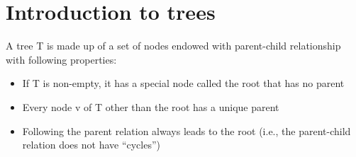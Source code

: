 \documentclass[12pt]{article}
\newcommand{\1}{\space \quad}
\newcommand{\2}{\quad \quad \quad}
\newcommand{\3}{\quad \quad \quad \quad \space}
\newcommand{\4}{\quad \quad \quad \quad \quad \quad}
\begin{document}
\section{Introduction to trees}
A tree T is made up of a set of nodes endowed with parent-child relationship with following properties:
\begin{itemize}
  \item If T is non-empty, it has a special node called the root that has no parent
  \item Every node v of T other than the root has a unique parent
  \item Following the parent relation always leads to the root (i.e., the parent-child relation does not have 
  “cycles”)
\end{itemize}
\end{document}
